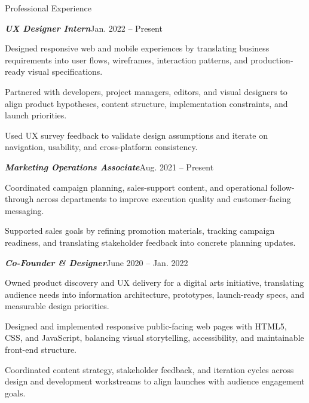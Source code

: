 \documentclass{resume} %
\begin{document}
\begin{rSection}{Professional Experience}
\begin{rSubsection}{\textbf{\textit{UX Designer Intern}}}{Jan. 2022 -- Present}{}{}
\item Designed responsive web and mobile experiences by translating business requirements into user flows, wireframes, interaction patterns, and production-ready visual specifications.
\item Partnered with developers, project managers, editors, and visual designers to align product hypotheses, content structure, implementation constraints, and launch priorities.
\item Used UX survey feedback to validate design assumptions and iterate on navigation, usability, and cross-platform consistency.
\end{rSubsection}

\begin{rSubsection}{\textbf{\textit{Marketing Operations Associate}}}{Aug. 2021 -- Present}{}{}
\item Coordinated campaign planning, sales-support content, and operational follow-through across departments to improve execution quality and customer-facing messaging.
\item Supported sales goals by refining promotion materials, tracking campaign readiness, and translating stakeholder feedback into concrete planning updates.
\end{rSubsection}

\begin{rSubsection}{\textbf{\textit{Co-Founder \& Designer}}}{June 2020 -- Jan. 2022}{}{}
\item Owned product discovery and UX delivery for a digital arts initiative, translating audience needs into information architecture, prototypes, launch-ready specs, and measurable design priorities.
\item Designed and implemented responsive public-facing web pages with HTML5, CSS, and JavaScript, balancing visual storytelling, accessibility, and maintainable front-end structure.
\item Coordinated content strategy, stakeholder feedback, and iteration cycles across design and development workstreams to align launches with audience engagement goals.
\end{rSubsection}


\end{rSection}
\end{document}
